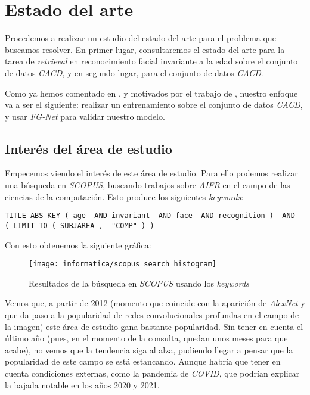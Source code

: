\chapter{Estado del arte} \label{ich:estado_arte}

Procedemos a realizar un estudio del estado del arte para el problema que buscamos resolver. En primer lugar, consultaremos el estado del arte para la tarea de \textit{retrieval } en reconocimiento facial invariante a la edad sobre el conjunto de datos \textit{CACD}, y en segundo lugar, para el conjunto de datos \textit{CACD}.

Como ya hemos comentado en , y motivados por el trabajo de \cite{informatica:best_fgnet_model}, nuestro enfoque va a ser el siguiente: realizar un entrenamiento sobre el conjunto de datos \textit{CACD}, y usar \textit{FG-Net} para validar nuestro modelo.

\section{Interés del área de estudio} \label{isec:interesareaestudio}

Empecemos viendo el interés de este área de estudio. Para ello podemos realizar una búsqueda en \textit{SCOPUS}, buscando trabajos sobre \textit{AIFR} en el campo de las ciencias de la computación. Esto produce los siguientes \textit{keywords}:

\begin{lstlisting}[caption=\textit{Keywords usados para la búsqueda en \textit{SCOPUS}}, label=code:scopus_search]
    TITLE-ABS-KEY ( age  AND invariant  AND face  AND recognition )  AND  ( LIMIT-TO ( SUBJAREA ,  "COMP" ) )
\end{lstlisting}

Con esto obtenemos la siguiente gráfica:

\begin{figure}[H]
    \centering
    \texttt{[image: informatica/scopus\_search\_histogram]}
    \caption{Resultados de la búsqueda en \textit{SCOPUS} usando los \textit{keywords} }
\end{figure}

Vemos que, a partir de 2012 (momento que coincide con la aparición de \textit{AlexNet} y que da paso a la popularidad de redes convolucionales profundas en el campo de la imagen) este área de estudio gana bastante popularidad. Sin tener en cuenta el último año (pues, en el momento de la consulta, quedan unos meses para que acabe), no vemos que la tendencia siga al alza, pudiendo llegar a pensar que la popularidad de este campo se está estancando. Aunque habría que tener en cuenta condiciones externas, como la pandemia de \textit{COVID}, que podrían explicar la bajada notable en los años 2020 y 2021.

